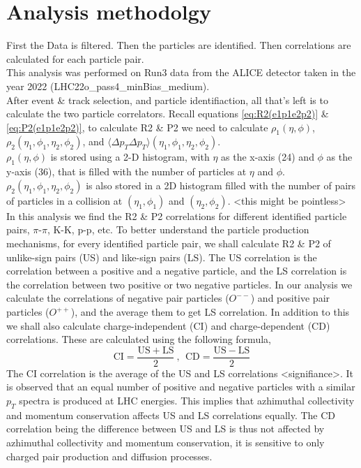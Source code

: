 \documentclass[12pt,a4paper,twoside]{report}
\begin{document}
\chapter{Analysis methodolgy}\label{Ch:Methodology}
First the Data is filtered. Then the particles are identified. Then correlations are calculated for each particle pair.\\
This analysis was performed on Run3 data from the ALICE detector taken in the year 2022 (LHC22o\_pass4\_minBias\_medium).\\ 
After event \& track selection, and particle identifiaction, all that's left is to calculate the two particle correlators. Recall equations \ref{eq:R2(e1p1e2p2)} \& \ref{eq:P2(e1p1e2p2)}, to calculate R2 \& P2 we need to calculate $\rho_1(\eta,\phi)$, $\rho_2(\eta_1,\phi_1,\eta_2,\phi_2)$, and $\langle\Delta p_T\Delta p_T\rangle(\eta_1,\phi_1,\eta_2,\phi_2)$.\\
$\rho_1(\eta,\phi)$ is stored using a 2-D histogram, with $\eta$ as the x-axis (24) and $\phi$ as the y-axis (36), that is filled with the number of particles at $\eta$ and $\phi$. $\rho_2(\eta_1,\phi_1,\eta_2,\phi_2)$ is also stored in a 2D histogram filled with the number of pairs of particles in a collision at $(\eta_1,\phi_1)$ and $(\eta_2,\phi_2)$. <this might be pointless>\\

In this analysis we find the R2 \& P2 correlations for different identified particle pairs, $\pi$-$\pi$, K-K, p-p, etc. To better understand the particle production mechanisms, for every identified particle pair, we shall calculate R2 \& P2 of unlike-sign pairs (US) and like-sign pairs (LS). The US correlation is the correlation between a positive and a negative particle, and the LS correlation is the correlation between two positive or two negative particles. In our analysis we calculate the correlations of negative pair particles ($O^{--}$) and positive pair particles ($O^{++}$), and the average them to get LS correlation. In addition to this we shall also calculate charge-independent (CI) and charge-dependent (CD) correlations. These are calculated using the following formula,
\begin{equation*}
	\mathrm{CI}=\frac{\mathrm{US}+\mathrm{LS}}{2}\ , \ \ \mathrm{CD}=\frac{\mathrm{US}-\mathrm{LS}}{2}
\end{equation*}
The CI correlation is the average of the US and LS correlations <signifiance>. It is observed that an equal number of positive and negative particles with a similar $p_T$ spectra is produced at LHC energies. This implies that azhimuthal collectivity and momentum conservation affects US and LS correlations equally. The CD correlation being the difference between US and LS is thus not affected by azhimuthal collectivity and momentum conservation, it is sensitive to only charged pair production and diffusion processes.
\end{document}
